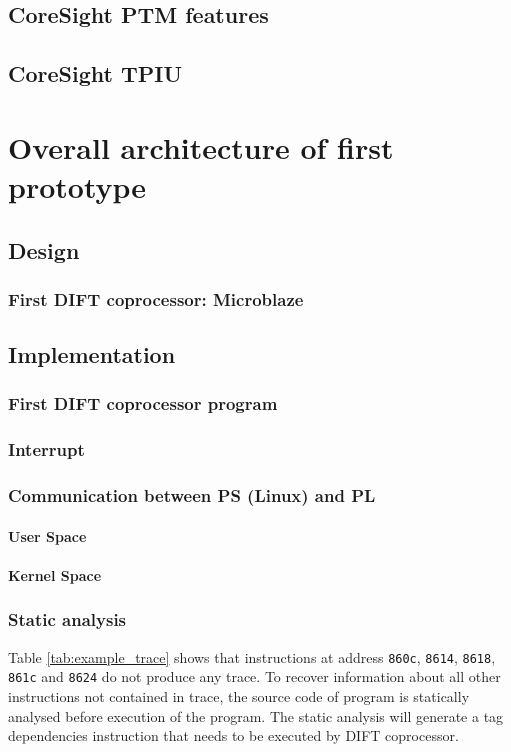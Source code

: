 \documentclass[10pt,a4paper, oneside]{memoir}
\begin{document}
\section{CoreSight PTM features}

\section{CoreSight TPIU}


\chapter{Overall architecture of first prototype}
\label{chap:overall_architecture}
\section{Design}
\subsection{First DIFT coprocessor: Microblaze}
\section{Implementation}
\subsection{First DIFT coprocessor program}
\subsection{Interrupt}
\subsection{Communication between PS (Linux) and PL}
\subsubsection{User Space}
\subsubsection{Kernel Space}
\subsection{Static analysis}
Table \ref{tab:example_trace} shows that instructions at address \texttt{860c}, \texttt{8614}, \texttt{8618}, \texttt{861c} and \texttt{8624} do not produce any trace. To recover information about all other instructions not contained in trace, the source code of program is statically analysed before execution of the program. The static analysis will generate a tag dependencies instruction that needs to be executed by DIFT coprocessor.
\end{document}
